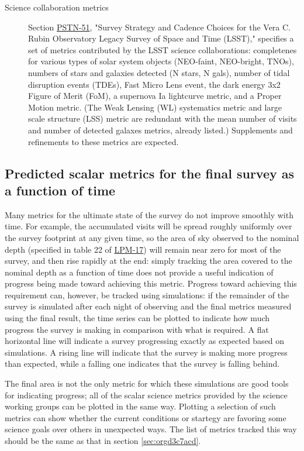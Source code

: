 \begin{description}
\item[{Science collaboration metrics}] Section \href{https://ls.st/pstn-051}{PSTN-51}, "Survey Strategy and Cadence Choices for the Vera C. Rubin Observatory Legacy Survey of Space and Time (LSST)," specifies a set of metrics contributed by the LSST science collaborations: completenes for various types of solar system objects (NEO-faint, NEO-bright, TNOs), numbers of stars and galaxies detected (N stars, N gals), number of tidal disruption events (TDEs), Fast Micro Lens event, the dark energy 3x2 Figure of Merit (FoM), a supernova Ia lightcurve metric, and a Proper Motion metric. (The Weak Lensing (WL) systematics metric and large scale structure (LSS) metric are redundant with the mean number of visits and number of detected galaxes metrics, already listed.) Supplements and refinements to these metrics are expected.
\end{description}

\subsection{Predicted scalar metrics for the final survey as a function of time}
\label{sec:org0a99696}
Many metrics for the ultimate state of the survey do not improve smoothly with time.
For example, the accumulated visits will be spread roughly uniformly over the survey footprint at any given time, so the area of sky observed to the nominal depth (specified in table 22 of \href{http://ls.st/lpm-17}{LPM-17}) will remain near zero for most of the survey, and then rise rapidly at the end: simply tracking the area covered to the nominal depth as a function of time does not provide a useful indication of progress being made toward achieving this metric.
Progress toward achieving this requirement can, however, be tracked using simulations: if the remainder of the survey is simulated after each night of observing and the final metrics measured using the final result, the time series can be plotted to indicate how much progress the survey is making in comparison with what is required.
A flat horizontal line will indicate a survey progressing exactly as expected based on simulations.
A rising line will indicate that the survey is making more progress than expected, while a falling one indicates that the survey is falling behind.

The final area is not the only metric for which these simulations are good tools for indicating progress; all of the scalar science metrics provided by the science working groups can be plotted in the same way. Plotting a selection of such metrics can show whether the current conditions or startegy are favoring some science goals over others in unexpected ways.
The list of metrics tracked this way should be the same as that in section \ref{sec:orgd3c7acd}.

